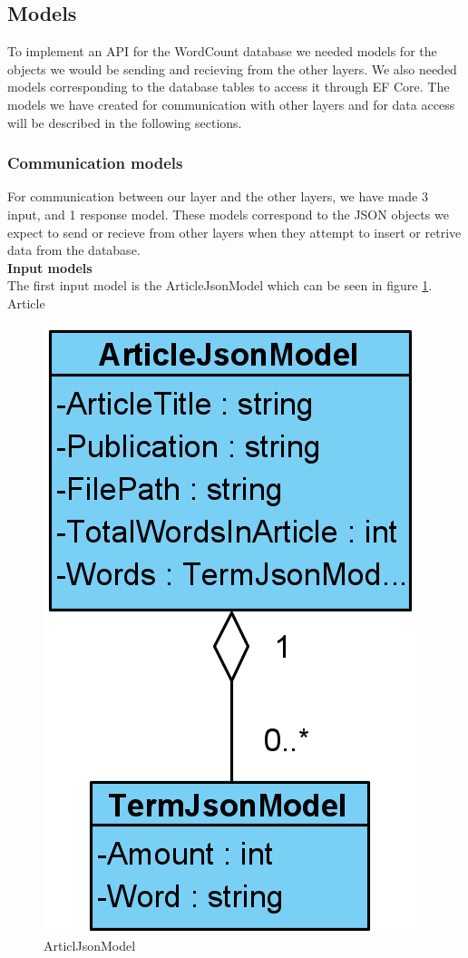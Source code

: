 \subsection{Models}
To implement an API for the WordCount database we needed models for the objects we would be sending and recieving from the other layers. We also needed models corresponding to the database tables to access it through EF Core. The models we have created for communication with other layers and for data access will be described in the following sections.

\subsubsection*{Communication models}
For communication between our layer and the other layers, we have made 3 input, and 1 response model. These models correspond to the JSON objects we expect to send or recieve from other layers when they attempt to insert or retrive data from the database. 
\\
\textbf{Input models}\\

The first input model is the ArticleJsonModel which can be seen in figure \ref{ArticlJsonModel}. Article

\begin{figure}[H]
    \centering
    \includegraphics[scale=0.25]{Images/jsonArticleModel.PNG}
    \caption{ArticlJsonModel}
    \label{ArticlJsonModel}
\end{figure}

